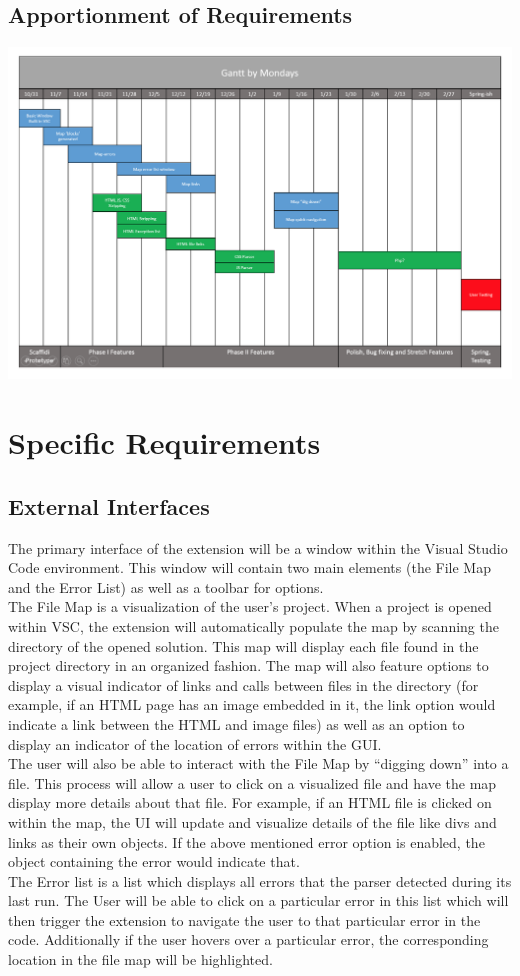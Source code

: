 \documentclass[letterpaper,10pt,titlepage,draftclsnofoot,onecolumn,onesided] {IEEEtran}
\begin{document}
\subsection{Apportionment of Requirements}
\includegraphics[scale=0.7]{gantt.png}

\section{Specific Requirements}

\subsection{External Interfaces}
The primary interface of the extension will be a window within the Visual Studio Code environment. This window will contain two main elements (the File Map and the Error List) as well as a toolbar for options.
\\
The File Map is a visualization of the user's project. When a project is opened within VSC, the extension will automatically populate the map by scanning the directory of the opened solution. This map will display each file found in the project directory in an organized fashion. The map will also feature options to display a visual indicator of links and calls between files in the directory (for example, if an HTML page has an image embedded in it, the link option would indicate a link between the HTML and image files) as well as an option to display an indicator of the location of errors within the GUI.
\\
The user will also be able to interact with the File Map by “digging down” into a file. This process will allow a user to click on a visualized file and have the map display more details about that file. For example, if an HTML file is clicked on within the map, the UI will update and visualize details of the file like divs and links as their own objects. If the above mentioned error option is enabled, the object containing the error would indicate that.
\\
The Error list is a list which displays all errors that the parser detected during its last run. The User will be able to click on a particular error in this list which will then trigger the extension to navigate the user to that particular error in the code. Additionally if the user hovers over a particular error, the corresponding location in the file map will be highlighted.
\end{document}
